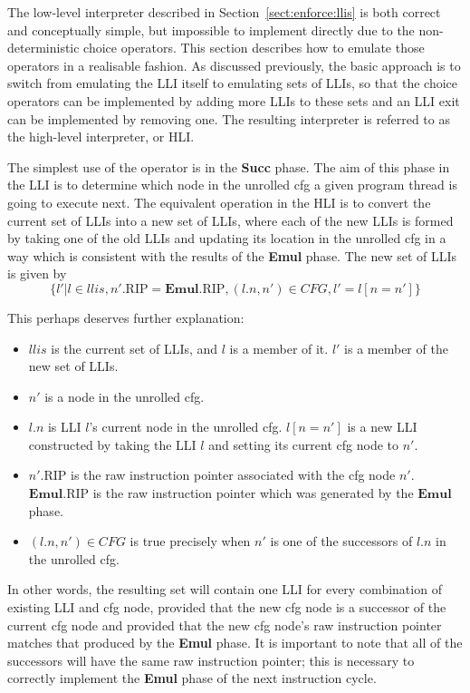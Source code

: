 The low-level interpreter described in Section~\ref{sect:enforce:llis}
is both correct and conceptually simple, but impossible to implement
directly due to the non-deterministic choice operators.  This section
describes how to emulate those operators in a realisable fashion.  As
discussed previously, the basic approach is to switch from emulating
the LLI itself to emulating sets of LLIs, so that the choice operators
can be implemented by adding more LLIs to these sets and an LLI exit
can be implemented by removing one.  The resulting interpreter is
referred to as the high-level interpreter, or HLI.

The simplest use of the operator is in the \textbf{Succ} phase.  The
aim of this phase in the LLI is to determine which node in the
unrolled \gls{cfg} a given program thread is going to execute next.  The
equivalent operation in the HLI is to convert the current set of LLIs
into a new set of LLIs, where each of the new LLIs is formed by taking
one of the old LLIs and updating its location in the unrolled \gls{cfg} in a
way which is consistent with the results of the \textbf{Emul} phase.
The new set of LLIs is given by
\begin{displaymath}
\{l' | l \in \mathit{llis}, n'.\mathrm{RIP} = \mathbf{Emul}.\mathrm{RIP}, (l.n, n') \in \mathit{CFG}, l' = l[n = n'] \}
\end{displaymath}

This perhaps deserves further explanation:

\begin{itemize}
\item $\mathit{llis}$ is the current set of LLIs, and $l$ is a member of it.
  $l'$ is a member of the new set of LLIs.
\item $n'$ is a node in the unrolled \gls{cfg}.
\item $l.n$ is LLI $l$'s current node in the unrolled \gls{cfg}.  $l[n =
  n']$ is a new LLI constructed by taking the LLI $l$ and setting its
  current \gls{cfg} node to $n'$.
\item $n'.\mathrm{RIP}$ is the raw instruction pointer associated with
  the \gls{cfg} node $n'$.  $\mathbf{Emul}.\mathrm{RIP}$ is the raw
  instruction pointer which was generated by the $\mathbf{Emul}$
  phase.
\item $(l.n, n') \in \mathit{CFG}$ is true precisely when $n'$ is one
  of the successors of $l.n$ in the unrolled \gls{cfg}.
\end{itemize}

In other words, the resulting set will contain one LLI for every
combination of existing LLI and \gls{cfg} node, provided that the new \gls{cfg}
node is a successor of the current \gls{cfg} node and provided that the new
\gls{cfg} node's raw instruction pointer matches that produced by the
\textbf{Emul} phase.  It is important to note that all of the
successors will have the same raw instruction pointer; this is
necessary to correctly implement the \textbf{Emul} phase of the next
instruction cycle.

